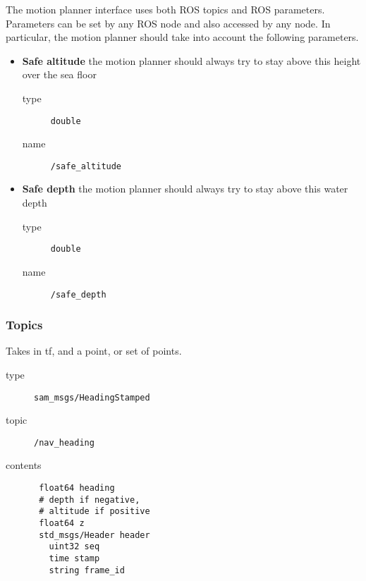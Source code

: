\documentclass[9pt,technote]{IEEEtran} %
\begin{document}
The motion planner interface uses both ROS topics and ROS parameters.
Parameters can be set by any ROS node and also accessed by any node.
In particular, the motion planner should take into account the following parameters.
\begin{itemize}
\item \textbf{Safe altitude} the motion planner should always try to stay above this height over the sea floor \begin{description}
\item[type] \texttt{double}
\item[name] \texttt{/safe\_altitude}
\end{description}
\item \textbf{Safe depth} the motion planner should always try to stay above this water depth \begin{description}
\item[type] \texttt{double}
\item[name] \texttt{/safe\_depth}
\end{description}  
\end{itemize}

\subsubsection{Topics}


Takes in tf, and a point, or set of points.

\begin{description}
\item[type] \texttt{sam\_msgs/HeadingStamped}
\item[topic] \texttt{/nav\_heading}
\item[contents] \begin{scriptsize}
\begin{verbatim}
 float64 heading
 # depth if negative,
 # altitude if positive
 float64 z
 std_msgs/Header header
   uint32 seq
   time stamp
   string frame_id
\end{verbatim}
\end{scriptsize}
\end{description}
\end{document}
